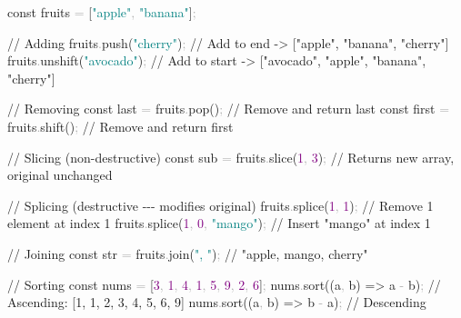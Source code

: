 \documentclass[
  justified,
  openright,
]{tufte-book}
\newcommand{\CommentTok}[1]{\textcolor{MidGray}{#1}}
\newcommand{\DecValTok}[1]{\textcolor{Purple}{#1}}
\newcommand{\FunctionTok}[1]{\textcolor{BrandBlue}{#1}}
\newcommand{\KeywordTok}[1]{\textcolor{BrandBlue}{#1}}
\newcommand{\NormalTok}[1]{#1}
\newcommand{\OperatorTok}[1]{\textcolor{DarkGray}{#1}}
\newcommand{\StringTok}[1]{\textcolor{Teal}{#1}}
\newenvironment{Shaded}{%
  \begin{snugshade}
}{%
  \end{snugshade}
}
\begin{document}
\begin{Shaded}
\begin{Highlighting}[]
\KeywordTok{const}\NormalTok{ fruits }\OperatorTok{=}\NormalTok{ [}\StringTok{"apple"}\OperatorTok{,} \StringTok{"banana"}\NormalTok{]}\OperatorTok{;}

\CommentTok{// Adding}
\NormalTok{fruits}\OperatorTok{.}\FunctionTok{push}\NormalTok{(}\StringTok{"cherry"}\NormalTok{)}\OperatorTok{;} \CommentTok{// Add to end {-}\textgreater{} ["apple", "banana", "cherry"]}
\NormalTok{fruits}\OperatorTok{.}\FunctionTok{unshift}\NormalTok{(}\StringTok{"avocado"}\NormalTok{)}\OperatorTok{;} \CommentTok{// Add to start {-}\textgreater{} ["avocado", "apple", "banana", "cherry"]}

\CommentTok{// Removing}
\KeywordTok{const}\NormalTok{ last }\OperatorTok{=}\NormalTok{ fruits}\OperatorTok{.}\FunctionTok{pop}\NormalTok{()}\OperatorTok{;} \CommentTok{// Remove and return last}
\KeywordTok{const}\NormalTok{ first }\OperatorTok{=}\NormalTok{ fruits}\OperatorTok{.}\FunctionTok{shift}\NormalTok{()}\OperatorTok{;} \CommentTok{// Remove and return first}

\CommentTok{// Slicing (non{-}destructive)}
\KeywordTok{const}\NormalTok{ sub }\OperatorTok{=}\NormalTok{ fruits}\OperatorTok{.}\FunctionTok{slice}\NormalTok{(}\DecValTok{1}\OperatorTok{,} \DecValTok{3}\NormalTok{)}\OperatorTok{;} \CommentTok{// Returns new array, original unchanged}

\CommentTok{// Splicing (destructive {-}{-}{-} modifies original)}
\NormalTok{fruits}\OperatorTok{.}\FunctionTok{splice}\NormalTok{(}\DecValTok{1}\OperatorTok{,} \DecValTok{1}\NormalTok{)}\OperatorTok{;} \CommentTok{// Remove 1 element at index 1}
\NormalTok{fruits}\OperatorTok{.}\FunctionTok{splice}\NormalTok{(}\DecValTok{1}\OperatorTok{,} \DecValTok{0}\OperatorTok{,} \StringTok{"mango"}\NormalTok{)}\OperatorTok{;} \CommentTok{// Insert "mango" at index 1}

\CommentTok{// Joining}
\KeywordTok{const}\NormalTok{ str }\OperatorTok{=}\NormalTok{ fruits}\OperatorTok{.}\FunctionTok{join}\NormalTok{(}\StringTok{", "}\NormalTok{)}\OperatorTok{;} \CommentTok{// "apple, mango, cherry"}

\CommentTok{// Sorting}
\KeywordTok{const}\NormalTok{ nums }\OperatorTok{=}\NormalTok{ [}\DecValTok{3}\OperatorTok{,} \DecValTok{1}\OperatorTok{,} \DecValTok{4}\OperatorTok{,} \DecValTok{1}\OperatorTok{,} \DecValTok{5}\OperatorTok{,} \DecValTok{9}\OperatorTok{,} \DecValTok{2}\OperatorTok{,} \DecValTok{6}\NormalTok{]}\OperatorTok{;}
\NormalTok{nums}\OperatorTok{.}\FunctionTok{sort}\NormalTok{((a}\OperatorTok{,}\NormalTok{ b) }\KeywordTok{=\textgreater{}}\NormalTok{ a }\OperatorTok{{-}}\NormalTok{ b)}\OperatorTok{;} \CommentTok{// Ascending: [1, 1, 2, 3, 4, 5, 6, 9]}
\NormalTok{nums}\OperatorTok{.}\FunctionTok{sort}\NormalTok{((a}\OperatorTok{,}\NormalTok{ b) }\KeywordTok{=\textgreater{}}\NormalTok{ b }\OperatorTok{{-}}\NormalTok{ a)}\OperatorTok{;} \CommentTok{// Descending}


\end{Highlighting}
\end{Shaded}
\end{document}

